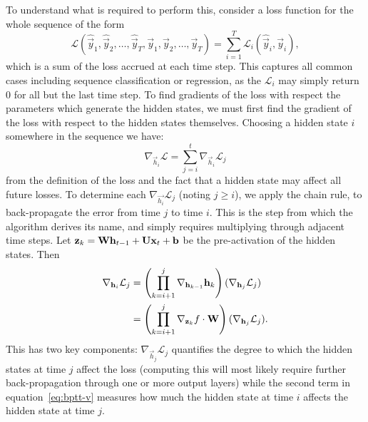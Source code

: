 To understand what is required to perform this, consider a loss function for the whole sequence of
the form
\begin{equation}
	\mathcal{L}(\hat{\vec{y}}_1, \hat{\vec{y}}_2, \dots, \hat{\vec{y}}_T,
				\vec{y}_1, \vec{y}_2, \dots, \vec{y}_T)
	= \sum_{i=1}^T \mathcal{L}_i(\hat{\vec{y}}_i, \vec{y}_i),
	\label{eq:seqloss}
\end{equation} which is a sum of the loss accrued at each time step. This captures all common
cases including sequence classification or regression, as the \(\mathcal{L}_i\) may simply return
\(0\) for all but the last time step. To find gradients of the loss with respect the parameters
which generate the hidden states, we must first find the gradient of the loss with respect to the
hidden states themselves. Choosing a hidden state \(i\) somewhere in the sequence we have:
\begin{equation}
	\nabla_{\vec{h}_i}\mathcal{L} = \sum_{j=i}^t \nabla_{\vec{h}_i}\mathcal{L}_j
	\label{eq:delhL}
\end{equation} from the definition of the loss and the fact that a hidden state may affect all
future losses. To determine each \(\nabla_{\vec{h_i}}\mathcal{L}_j\) (noting \(j \geq i\)), we
apply the chain rule, to back-propagate the error from time \(j\) to time \(i\). This is the step
from which the algorithm derives its name, and simply requires multiplying through adjacent
time steps. Let \(\mathbf{z}_k = \mathbf{W}\mathbf{h}_{t-1} + \mathbf{U}\mathbf{x}_t +  \mathbf{b}\) be the
pre-activation of the hidden states. Then
\begin{align}
	\nabla_{\mathbf{h}_i} \mathcal{L}_j &= 
	\left(\prod_{k=i+1}^j \nabla_{\mathbf{h}_{k-1}} \mathbf{h}_k\right)
	(\nabla_{\mathbf{h}_j}\mathcal{L}_j) \\
	&=  \left(\prod_{k=i+1}^j \nabla_{\mathbf{z}_k}f \cdot \mathbf{W}\right)
	(\nabla_{\mathbf{h}_j}\mathcal{L}_j).
	\label{eq:bptt-v}
\end{align} This has two key components: \(\nabla_{\vec{h}_j}\mathcal{L}_j\) quantifies the degree
to which the hidden states at time \(j\) affect the loss (computing this will most likely require
further back-propagation through one or more output layers) while the second term in
equation~\eqref{eq:bptt-v} measures how much the hidden state at time \(i\) affects the hidden
state at time \(j\).

